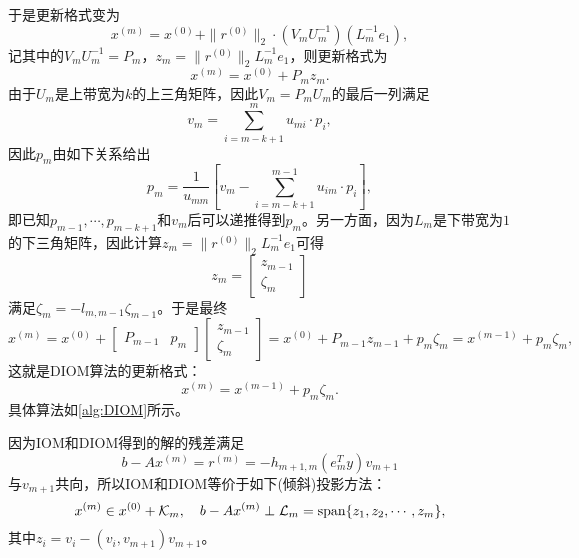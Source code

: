 \documentclass[a4paper,10pt]{ctexart}
\begin{document}
于是更新格式变为
\[
    x^{(m)} = x^{(0)} + \| r^{(0)} \|_2 \cdot (V_m U_m^{-1})(L_m^{-1}e_{1}),
\]
记其中的$ V_mU_m^{-1} = P_m $，$ z_m = \| r^{(0)} \|_2 L_m^{-1}e_1 $，则更新格式为
\begin{equation}
    x^{(m)} = x^{(0)} + P_m z_m.
\end{equation}
由于$ U_m $是上带宽为$ k $的上三角矩阵，因此$ V_m = P_mU_m $的最后一列满足
\[
    v_m = \sum_{i=m-k+1}^m u_{mi}\cdot p_i,
\]
因此$ p_m $由如下关系给出
\begin{equation}
    p_m = \frac{1}{u_{mm}} \left[ v_m - \sum_{i=m-k+1}^{m-1} u_{im}\cdot p_i \right] ,
\end{equation}
即已知$ p_{m-1},\cdots ,p_{m-k+1} $和$ v_m $后可以递推得到$ p_m $。另一方面，因为$ L_m $是下带宽为$ 1 $的下三角矩阵，因此计算$ z_m = \| r^{(0)} \|_2L_m^{-1}e_1 $可得
\begin{equation}
    z_m = 
    \begin{bmatrix} 
        z_{m-1} \\ \zeta_{m} 
    \end{bmatrix} 
\end{equation}
满足$ \zeta_{m} = -l_{m,m-1} \zeta_{m-1} $。于是最终
\[
    x^{(m)} = x^{(0)} + 
    \begin{bmatrix} 
        P_{m-1} & p_m
    \end{bmatrix}
    \begin{bmatrix} 
        z_{m-1} \\ \zeta_{m}
    \end{bmatrix} = 
    x^{(0)} + P_{m-1}z_{m-1} + p_m \zeta_{m} = x^{(m-1)} + p_m \zeta_{m},
\]
这就是DIOM算法的更新格式：
\begin{equation}
    x^{(m)} = x^{(m-1)} + p_m \zeta_{m}.
\end{equation}
具体算法如\ref{alg:DIOM}所示。

因为IOM和DIOM得到的解的残差满足
\[
    b - Ax^{(m)} = r^{(m)} = -h_{m+1,m}(e^T_m y) v_{m+1}
\]
与$ v_{m+1} $共向，所以IOM和DIOM等价于如下(倾斜)投影方法：
\begin{equation}
    x^{(m)} \in x^{(0)} + \mathcal{K}_m,\quad b - Ax^{(m)}\perp \mathcal{L}_m = {\rm span}\{z_1,z_2,\cdots ,z_m\},
\end{equation}
其中$ z_i = v_i - (v_i,v_{m+1})v_{m+1} $。
\newpage
\end{document}
